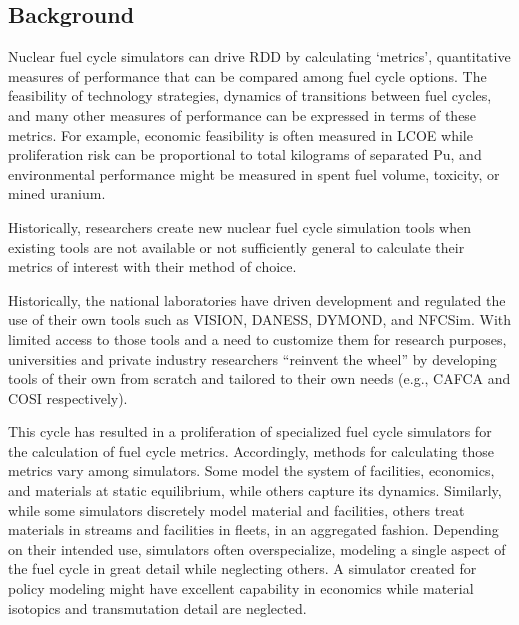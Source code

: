 \subsection{Background}



Nuclear fuel cycle simulators can drive \gls{RDD} by calculating `metrics', 
quantitative measures of performance that 
can be compared among fuel cycle options. The feasibility of technology 
strategies, dynamics of transitions between fuel cycles, and many other 
measures of performance can be expressed in terms of these metrics. For example, 
economic feasibility is often measured in \gls{LCOE} while proliferation risk 
can be proportional to total kilograms of separated Pu, and environmental 
performance might be measured in spent fuel volume, toxicity, or mined uranium.

Historically, researchers create new nuclear fuel cycle simulation tools when 
existing tools are not available or not sufficiently general to calculate their 
metrics of interest with their method of choice.

Historically, the national laboratories have driven development and regulated 
the use of their own tools such as \gls{VISION}\cite{jacobson_verifiable_2010}, 
\gls{DANESS}\cite{van_den_durpel_daness_2009}, 
\gls{DYMOND}\cite{modeling_yacout_2005}, and 
\gls{NFCSim}\cite{schneider_nfcsim:_2005}. With limited access to those tools 
and a need to customize them for research purposes, 
universities and private industry researchers ``reinvent the wheel'' by 
developing tools of their own from scratch and tailored to their own needs (e.g., 
\gls{CAFCA}\cite{guerin_benchmark_2006} and \gls{COSI}\cite{cosi} 
respectively). 

This cycle has resulted in a proliferation of specialized
fuel cycle simulators for the calculation of fuel cycle metrics.  Accordingly, methods 
for calculating those metrics vary among simulators. Some model the 
system of facilities, economics, and materials at static equilibrium, while 
others capture its dynamics.  
Similarly, while some simulators discretely model material and facilities, 
others treat materials in streams and facilities in fleets, in an aggregated 
fashion. Depending on their intended use, simulators often overspecialize, 
modeling a single aspect of the fuel cycle in great detail while neglecting 
others. A simulator created for policy modeling might have excellent 
capability in economics while material isotopics and transmutation detail are 
neglected.

